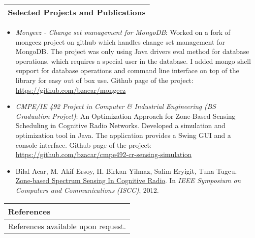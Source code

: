 \documentclass[11pt]{article}
\newcommand{\bigspace}{\vspace{0.4cm}}
\begin{document}
\bigspace
\begin{tabular}{p{18cm}}
\textbf{Selected Projects and Publications} \\
\hline
\end{tabular}

\begin{itemize}
\item \textit{Mongeez - Change set management for MongoDB}: Worked on a fork of mongeez project on github which handles change set management for MongoDB. The project was only using Java drivers eval method for database operations, which requires a special user in the database. I added mongo shell support for database operations and command line interface on top of the library for easy out of box use. Github page of the project: \url{https://github.com/bzacar/mongeez}
\item \textit{CMPE/IE 492 Project in Computer \& Industrial Engineering (BS Graduation Project)}: An Optimization Approach for Zone-Based Sensing Scheduling in Cognitive Radio Networks. Developed a simulation and optimization tool in Java. The application provides a Swing GUI and a console interface. Github page of the project: \url{https://github.com/bzacar/cmpe492-cr-sensing-simulation}
\item Bilal Acar, M. Akif Ersoy, H. Birkan Yilmaz, Salim Eryigit, Tuna Tugcu. \href{http://www.computer.org/csdl/proceedings/iscc/2012/2712/00/IS273.pdf}{Zone-based Spectrum Sensing In Cognitive Radio}. In \textit{IEEE Symposium on Computers and Communications (ISCC)}, 2012.
\end{itemize}

\begin{tabular}{p{18cm}}
\textbf{References} \\
\hline
\vspace{0.2cm}
References available upon request.
\end{tabular}
\end{document}

